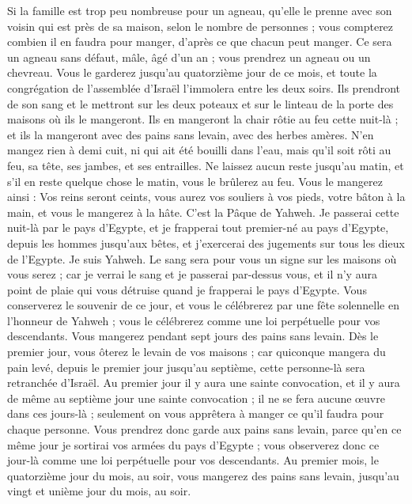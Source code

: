 \begin{multicols}{2}
Si la famille est trop peu nombreuse pour un agneau, qu'elle le prenne avec son voisin qui est près de sa maison, selon le nombre de personnes ; vous compterez combien il en faudra pour manger, d’après ce que chacun peut manger.
Ce sera un agneau sans défaut, mâle\FTNT{}, âgé d’un an ; vous prendrez un agneau ou un chevreau.
Vous le garderez jusqu'au quatorzième jour de ce mois, et toute la congrégation de l'assemblée d'Israël l’immolera entre les deux soirs.
Ils prendront de son sang et le mettront sur les deux poteaux et sur le linteau de la porte des maisons où ils le mangeront.
Ils en mangeront la chair rôtie au feu cette nuit-là ; et ils la mangeront avec des pains sans levain, avec des herbes amères.
N'en mangez rien à demi cuit, ni qui ait été bouilli dans l'eau, mais qu'il soit rôti au feu, sa tête, ses jambes, et ses entrailles.
Ne laissez aucun reste jusqu’au matin, et s'il en reste quelque chose le matin, vous le brûlerez au feu.
Vous le mangerez ainsi : Vos reins seront ceints, vous aurez vos souliers à vos pieds, votre bâton à la main, et vous le mangerez à la hâte. C'est la Pâque de Yahweh.
Je passerai cette nuit-là par le pays d'Egypte, et je frapperai tout premier-né au pays d'Egypte, depuis les hommes jusqu’aux bêtes, et j'exercerai des jugements sur tous les dieux de l'Egypte. Je suis Yahweh.
Le sang sera pour vous un signe sur les maisons où vous serez ; car je verrai le sang et je passerai par-dessus vous, et il n'y aura point de plaie qui vous détruise quand je frapperai le pays d'Egypte.
Vous conserverez le souvenir de ce jour, et vous le célébrerez par une fête solennelle en l’honneur de Yahweh ; vous le célébrerez comme une loi perpétuelle pour vos descendants.
Vous mangerez pendant sept jours des pains sans levain. Dès le premier jour, vous ôterez le levain de vos maisons ; car quiconque mangera du pain levé, depuis le premier jour jusqu’au septième, cette personne-là sera retranchée d'Israël.
Au premier jour il y aura une sainte convocation, et il y aura de même au septième jour une sainte convocation ; il ne se fera aucune œuvre dans ces jours-là ; seulement on vous apprêtera à manger ce qu'il faudra pour chaque personne.
Vous prendrez donc garde aux pains sans levain, parce qu'en ce même jour je sortirai vos armées du pays d'Egypte ; vous observerez donc ce jour-là comme une loi perpétuelle pour vos descendants.
Au premier mois, le quatorzième jour du mois, au soir, vous mangerez des pains sans levain, jusqu'au vingt et unième jour du mois, au soir.

\end{multicols}

